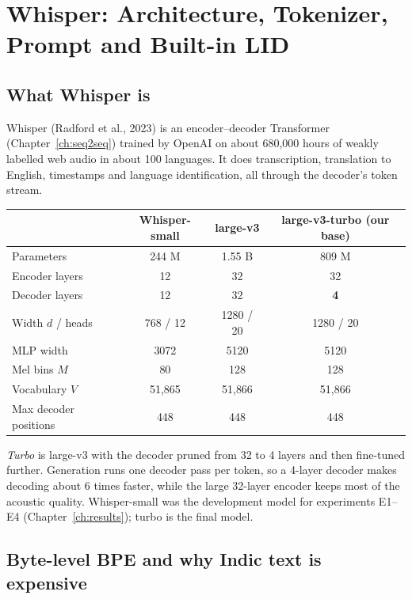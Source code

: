 \chapter{Whisper: Architecture, Tokenizer, Prompt and Built-in LID}
\label{ch:whisper}

\section{What Whisper is}

Whisper (Radford et al., 2023) is an encoder--decoder Transformer (Chapter~\ref{ch:seq2seq}) trained by OpenAI on about 680{,}000
hours of weakly labelled web audio in about 100 languages. It does transcription, translation to English, timestamps and language
identification, all through the decoder's token stream.

\begin{center}
\begin{tabular}{lccc}
\toprule
 & Whisper-small & large-v3 & \textbf{large-v3-turbo} (our base)\\
\midrule
Parameters & 244 M & 1.55 B & 809 M\\
Encoder layers & 12 & 32 & 32\\
Decoder layers & 12 & 32 & \textbf{4}\\
Width $d$ / heads & 768 / 12 & 1280 / 20 & 1280 / 20\\
MLP width & 3072 & 5120 & 5120\\
Mel bins $M$ & 80 & 128 & 128\\
Vocabulary $V$ & 51{,}865 & 51{,}866 & 51{,}866\\
Max decoder positions & 448 & 448 & 448\\
\bottomrule
\end{tabular}
\end{center}

\emph{Turbo} is large-v3 with the decoder pruned from 32 to 4 layers and then fine-tuned further. Generation runs one decoder pass
per token, so a 4-layer decoder makes decoding about 6 times faster, while the large 32-layer encoder keeps most of the acoustic
quality. Whisper-small was the development model for experiments E1--E4 (Chapter~\ref{ch:results}); turbo is the final model.

\section{Byte-level BPE and why Indic text is expensive}

